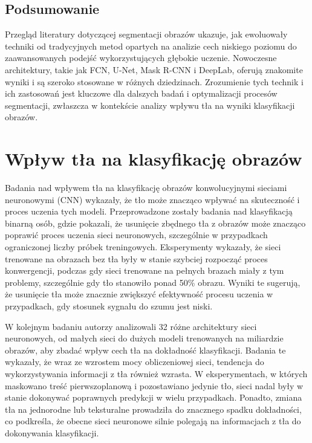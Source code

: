 \subsection*{Podsumowanie}

Przegląd literatury dotyczącej segmentacji obrazów ukazuje, jak ewoluowały techniki od tradycyjnych 
metod opartych na analizie cech niskiego poziomu do zaawansowanych podejść wykorzystujących głębokie 
uczenie. Nowoczesne architektury, takie jak FCN, U-Net, Mask R-CNN i DeepLab, oferują znakomite wyniki 
i są szeroko stosowane w różnych dziedzinach. Zrozumienie tych technik i ich zastosowań jest kluczowe 
dla dalszych badań i optymalizacji procesów segmentacji, zwłaszcza w kontekście analizy wpływu tła na 
wyniki klasyfikacji obrazów.


\section*{Wpływ tła na klasyfikację obrazów}

Badania nad wpływem tła na klasyfikację obrazów konwolucyjnymi sieciami neuronowymi (CNN) wykazały, 
że tło może znacząco wpływać na skuteczność i proces uczenia tych modeli. Przeprowadzone zostały badania nad klasyfikacją binarną osób, gdzie pokazali, że usunięcie zbędnego 
tła z obrazów może znacząco poprawić proces uczenia sieci neuronowych, szczególnie w przypadkach 
ograniczonej liczby próbek treningowych. Eksperymenty wykazały, że sieci trenowane na obrazach bez 
tła były w stanie szybciej rozpocząć proces konwergencji, podczas gdy sieci trenowane na pełnych 
brazach miały z tym problemy, szczególnie gdy tło stanowiło ponad 50\% obrazu. Wyniki te sugerują, 
że usunięcie tła może znacznie zwiększyć efektywność procesu uczenia w przypadkach, gdy stosunek 
sygnału do szumu jest niski. \cite{bg_1}

W kolejnym badaniu autorzy analizowali 32 różne architektury sieci neuronowych, od małych sieci do 
dużych modeli trenowanych na miliardzie obrazów, aby zbadać wpływ cech tła na dokładność klasyfikacji. 
Badania te wykazały, że wraz ze wzrostem mocy obliczeniowej sieci, tendencja do wykorzystywania 
informacji z tła również wzrasta. W eksperymentach, w których maskowano treść pierwszoplanową i 
pozostawiano jedynie tło, sieci nadal były w stanie dokonywać poprawnych predykcji w wielu 
przypadkach. Ponadto, zmiana tła na jednorodne lub teksturalne prowadziła do znacznego spadku 
dokładności, co podkreśla, że obecne sieci neuronowe silnie polegają na informacjach z tła do 
dokonywania klasyfikacji. \cite{bg_2}

